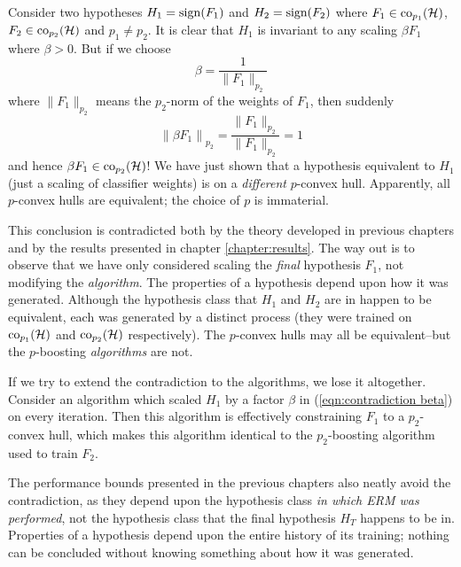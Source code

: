 Consider two hypotheses $H_1 = \mathrm{sign}(F_1)$ and $H_2 = \mathrm{sign}(F_2)$
where $F_1 \in \mathrm{co}_{p_1}(\mathcal{H})$, $F_2 \in \mathrm{co}_{p_2}(\mathcal{H})$ and
$p_1 \neq p_2$.  It is clear that $H_1$ is invariant to any scaling
$\beta F_1$ where $\beta > 0$.  But if we choose
%
\begin{equation}
\label{eqn:contradiction beta}
\beta = \frac{1}{\|F_1\|_{p_2}}
\end{equation}
%
where $\|F_1\|_{p_2}$ means the $p_2$-norm of the weights of $F_1$, 
then suddenly
%
\begin{equation}
\left\| \beta F_1 \right\|_{p_2} = \frac{\|F_1\|_{p_2}}{\|F_1\|_{p_2}}
= 1
\end{equation}
%
and hence $\beta F_1 \in \mathrm{co}_{p_2}(\mathcal{H})$!  We have just shown that
a hypothesis equivalent to $H_1$ (just a scaling of classifier
weights) is on a \emph{different} $p$-convex hull.
Apparently, all $p$-convex hulls are equivalent; the choice of $p$ is
immaterial.

This conclusion is contradicted both by the theory developed in
previous chapters and by the results presented in chapter
\ref{chapter:results}.  The way out is to observe that we have only
considered scaling the \emph{final} hypothesis 
$F_1$, not modifying the \emph{algorithm}.  The properties of a
hypothesis depend upon how it was
generated.  Although the hypothesis class that $H_1$ and $H_2$ are in
happen to be equivalent, each was generated by a distinct process
(they were trained on $\mathrm{co}_{p_1}(\mathcal{H})$ and $\mathrm{co}_{p_2}(\mathcal{H})$
respectively).  The $p$-convex hulls may all be equivalent--but the
$p$-boosting \emph{algorithms} are not.

If we try to extend the contradiction to the algorithms, we lose
it altogether.  Consider an algorithm which scaled $H_1$ by a factor
$\beta$ in (\ref{eqn:contradiction beta}) on every iteration.  Then
this algorithm is effectively constraining $F_1$ to a $p_2$-convex
hull, which makes this algorithm identical to the $p_2$-boosting
algorithm used to train $F_2$.

The performance bounds presented in the previous chapters also neatly
avoid the contradiction, as they depend upon the hypothesis class
\emph{in which ERM was performed}, not the hypothesis class that the
final hypothesis $H_T$ happens to be in.  Properties of a hypothesis
depend upon the entire history of its training; nothing can be
concluded without knowing something about how it was generated.
